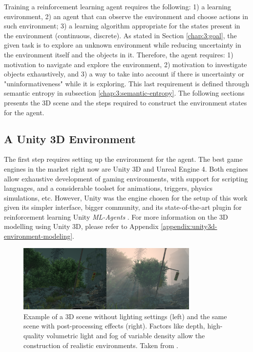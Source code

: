 Training a reinforcement learning agent requires the following: 1) a learning environment, 2) an agent that can observe the environment and choose actions in such environment; 3) a learning algorithm appropriate for the states present in the environment (continuous, discrete). 
As stated in Section \ref{chap:3:goal}, the given task is to explore an unknown environment while reducing uncertainty in the environment itself and the objects in it. Therefore, the agent requires: 1) motivation to navigate and explore the environment, 2) motivation to investigate objects exhaustively, and 3) a way to take into account if there is uncertainty or "uninformativeness" while it is exploring. This last requirement is defined through semantic entropy in subsection \ref{chap:3:semantic-entropy}. 
The following sections presents the 3D scene and the steps required to construct the environment states for the agent.

\subsection{A Unity 3D Environment}
The first step requires setting up the environment for the agent. The best game engines in the market right now are Unity 3D and Unreal Engine 4. Both engines allow exhaustive development of gaming environments, with support for scripting languages, and a considerable toolset for animations, triggers, physics simulations, etc. However, Unity was the engine chosen for the setup of this work given its simpler interface, bigger community, and its state-of-the-art plugin for reinforcement learning
Unity \textit{ML-Agents} \cite{incredibuild2021unityvsunreal, juliani2018unity}. 
For more information on the 3D modelling using Unity 3D, please refer to Appendix \ref{appendix:unity3d-environment-modeling}.


\begin{figure}[!ht]
        \centering
        \includegraphics[width=0.8\textwidth]{images/unity-lighting.png}
        \caption{Example of a 3D scene without lighting settings (left) and the same scene with post-processing effects (right). Factors like depth, high-quality volumetric light and fog of variable density allow the construction of realistic environments. Taken from \cite{unity_volumetric_light}.
        }
        \label{fig:unity-light}
\end{figure}

